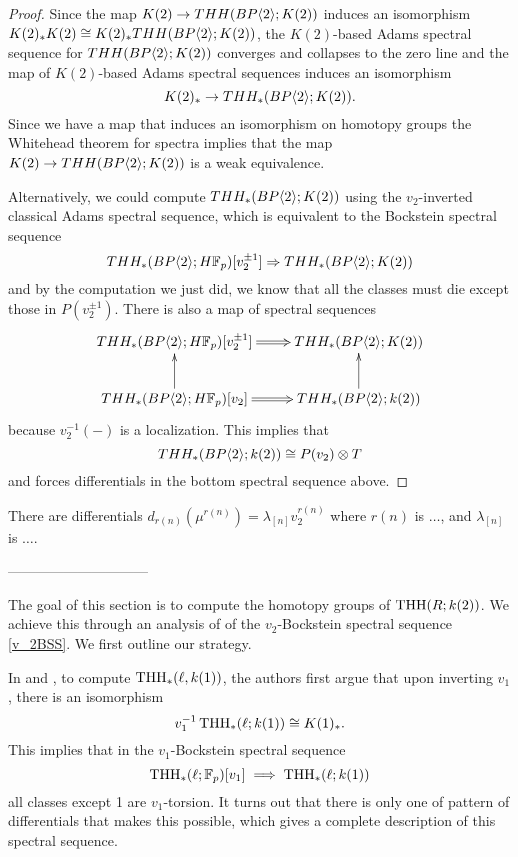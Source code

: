\begin{proof}
Since the map $K(2)\rightarrow THH(BP\langle 2 \rangle;K(2))$ induces an isomorphism $K(2)_*K(2)\cong K(2)_*THH(BP\langle 2 \rangle;K(2))$, the $K(2)$-based Adams spectral sequence for $THH(BP\langle 2 \rangle;K(2))$ converges and collapses to the zero line and the map of $K(2)$-based Adams spectral sequences induces an isomorphism
\[ K(2)_*\rightarrow THH_*(BP\langle 2 \rangle;K(2)).\] 
Since we have a map that induces an isomorphism on homotopy groups the Whitehead theorem for spectra implies that the map $K(2)\rightarrow THH(BP\langle 2 \rangle;K(2))$ is a weak equivalence. 

Alternatively, we could compute $THH_*(BP\langle 2 \rangle;K(2))$ using the $v_2$-inverted classical Adams spectral sequence, which is equivalent to the Bockstein spectral sequence 
\[ THH_*(BP\langle 2 \rangle;H\mathbb{F}_p)[v_2^{\pm 1}]\Rightarrow THH_*(BP\langle 2 \rangle;K(2))\]
and by the computation we just did, we know that all the classes must die except those in $P(v_2^{\pm 1})$. There is also a map of spectral sequences 
\[ 
\xymatrix{
THH_*(\tBP{2};H\mathbb{F}_p)[v_2^{\pm 1}] \ar@{=>}[r] & THH_*(\tBP{2};K(2)) \\
THH_*(\tBP{2};H\mathbb{F}_p)[v_2]  \ar[u] \ar@{=>}[r] &THH_*(\tBP{2};k(2)) \ar[u] 
}
\] 
because $v_2^{-1}(-)$ is a localization. This implies that 
\[ THH_*(BP\langle 2 \rangle;k(2))\cong P(v_2)\otimes T \] 
and forces differentials in the bottom spectral sequence above.
\end{proof}
\begin{cor}
There are differentials $d_{r(n)}(\mu^{r(n)})=\lambda_{[n]}v_2^{r(n)}$
where $r(n)$ is $\dots$, and $\lambda_{[n]}$ is $\dots$.
\end{cor}


------------------------------


The goal of this section is to compute the homotopy groups of $\operatorname{THH}(R; k(2))$. We achieve this through an analysis of of the $v_2$-Bockstein spectral sequence \eqref{v_2BSS}. We first outline our strategy. 

In \cite{AngeltveitRognes} and \cite{McClureStaffeldt}, to compute $\operatorname{THH}_*(\ell, k(1))$, the authors first argue that upon inverting $v_1$, there is an isomorphism
\begin{equation}\label{eqn:THH(ell;K(1))}
	v_1^{-1}\operatorname{THH}_*(\ell;k(1))\cong K(1)_*.
\end{equation}
This implies that in the $v_1$-Bockstein spectral sequence
\[
\operatorname{THH}_*(\ell;\mathbb{F}_p)[v_1]\implies \operatorname{THH}_*(\ell;k(1))
\]
all classes except 1 are $v_1$-torsion. It turns out that there is only one of pattern of differentials that makes this possible, which gives a complete description of this spectral sequence. 

